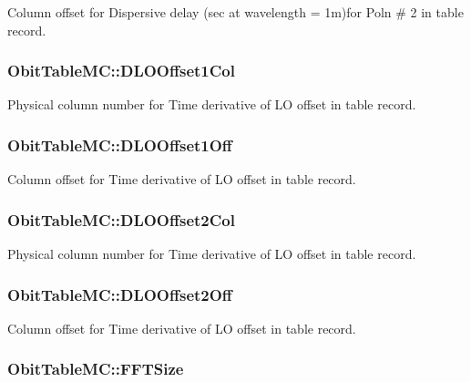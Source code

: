 Column offset for Dispersive delay (sec at wavelength = 1m)for Poln \# 2 in table record. 

\subsubsection{ {\bf Obit\-Table\-MC::DLOOffset1Col}}\label{structObitTableMC_o55}


Physical column number for Time derivative of LO offset in table record. 

\subsubsection{ {\bf Obit\-Table\-MC::DLOOffset1Off}}\label{structObitTableMC_o54}


Column offset for Time derivative of LO offset in table record. 

\subsubsection{ {\bf Obit\-Table\-MC::DLOOffset2Col}}\label{structObitTableMC_o67}


Physical column number for Time derivative of LO offset in table record. 

\subsubsection{ {\bf Obit\-Table\-MC::DLOOffset2Off}}\label{structObitTableMC_o66}


Column offset for Time derivative of LO offset in table record. 

\subsubsection{ {\bf Obit\-Table\-MC::FFTSize}}\label{structObitTableMC_o25}


